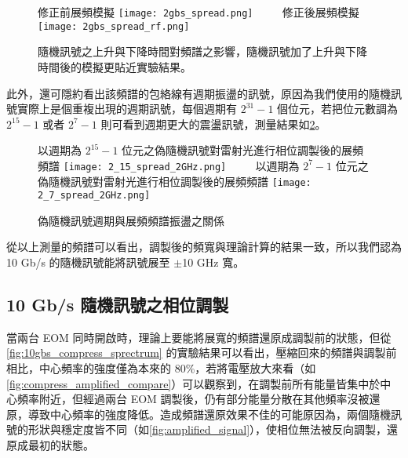 \documentclass[class=NCU_thesis, crop=false]{standalone}
\begin{document}
\begin{figure}[!hbt]
    \centering
    \subcaptionbox
        {修正前展頻模擬
        \label{fig:subfig_fig1}}
        {\texttt{[image: 2gbs\_spread.png]}}
    ~~~~
    \subcaptionbox
        {修正後展頻模擬
        \label{fig:subfig_fig2}}
        {\texttt{[image: 2gbs\_spread\_rf.png]}}
    \caption[隨機訊號之上升與下降時間對頻譜之影響]{隨機訊號之上升與下降時間對頻譜之影響，隨機訊號加了上升與下降時間後的模擬更貼近實驗結果。}
    \label{fig:simulation_rising_falling}
\end{figure}

此外，還可隱約看出該頻譜的包絡線有週期振盪的訊號，原因為我們使用的隨機訊號實際上是個重複出現的週期訊號，每個週期有 $2^{31}-1$ 個位元，若把位元數調為 $2^{15}-1$ 或者 $2^{7}-1$ 則可看到週期更大的震盪訊號，測量結果如\cref{fig:different_length_PRBS}。

\begin{figure}[!hbt]
    \centering
    \subcaptionbox
        {以週期為 $2^{15}-1$ 位元之偽隨機訊號對雷射光進行相位調製後的展頻頻譜
        \label{fig:subfig_fig1}}
        {\texttt{[image: 2\_15\_spread\_2GHz.png]}}
    ~~~~
    \subcaptionbox
        {以週期為 $2^{7}-1$ 位元之偽隨機訊號對雷射光進行相位調製後的展頻頻譜
        \label{fig:subfig_fig2}}
        {\texttt{[image: 2\_7\_spread\_2GHz.png]}}
    \caption{偽隨機訊號週期與展頻頻譜振盪之關係}
    \label{fig:different_length_PRBS}
\end{figure}

從以上測量的頻譜可以看出，調製後的頻寬與理論計算的結果一致，所以我們認為 10 Gb/s 的隨機訊號能將訊號展至 $\pm$10 GHz 寬。

\subsection{10 Gb/s 隨機訊號之相位調製}

當兩台 EOM 同時開啟時，理論上要能將展寬的頻譜還原成調製前的狀態，但從\cref{fig:10gbs_compress_sprectrum} 的實驗結果可以看出，壓縮回來的頻譜與調製前相比，中心頻率的強度僅為本來的 80\%，若將電壓放大來看（如\cref{fig:compress_amplified_compare}）可以觀察到，在調製前所有能量皆集中於中心頻率附近，但經過兩台 EOM 調製後，仍有部分能量分散在其他頻率沒被還原，導致中心頻率的強度降低。造成頻譜還原效果不佳的可能原因為，兩個隨機訊號的形狀與穩定度皆不同（如\cref{fig:amplified_signal}），使相位無法被反向調製，還原成最初的狀態。
\end{document}
